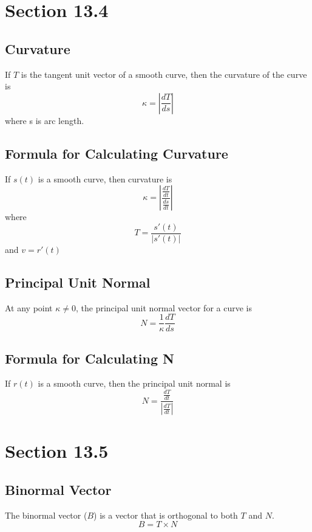\documentclass[../main.tex]{subfiles}
\begin{document}
\section{Section 13.4}

\subsection{Curvature}
If $T$ is the tangent unit vector of a smooth curve, then the curvature of the curve is
\begin{equation*}
\kappa = \left| \frac{dT}{ds} \right|
\end{equation*}
where s is arc length.

\subsection{Formula for Calculating Curvature}
If $s(t)$ is a smooth curve, then curvature is 
\begin{equation*}
\kappa = \left| \frac{\frac{dT}{dt}}{\frac{ds}{dt}} \right|
\end{equation*}
where 
\begin{equation*}
T = \frac{s'(t)}{|s'(t)|}
\end{equation*}
and $v = r'(t)$

\subsection{Principal Unit Normal}
At any point $\kappa \neq 0$, the principal unit normal vector for a curve is 
\begin{equation*}
N = \frac{1}{\kappa} \frac{dT}{ds}
\end{equation*}

\subsection{Formula for Calculating N}
If $r(t)$ is a smooth curve, then the principal unit normal is
\begin{equation*}
N = \frac{\frac{dT}{dt}}{\left| \frac{dT}{dt} \right |}
\end{equation*}

\section{Section 13.5}

\subsection{Binormal Vector}
The binormal vector ($B$) is a vector that is orthogonal to both $T$ and $N$. 
\begin{equation*}
B = T \times N 
\end{equation*}
\end{document}
